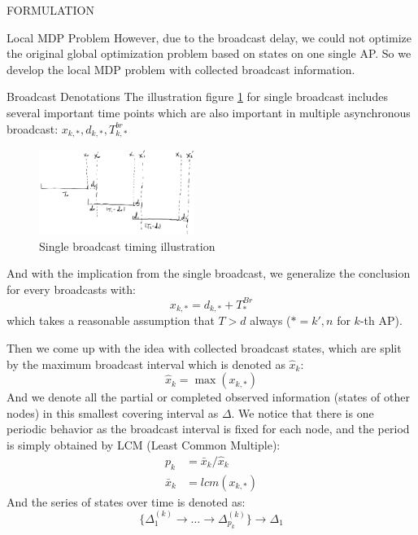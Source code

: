 \documentclass[10pt, conference, letterpaper]{IEEEtran}
\begin{document}
\begin{section}{FORMULATION}
\begin{subsection}{Local MDP Problem}
            However, due to the broadcast delay, we could not optimize the original global optimization problem based on states on one single AP. So we develop the local MDP problem with collected broadcast information.

            \begin{subsubsection}{Broadcast Denotations}
                The illustration figure \ref{fig:brd} for single broadcast includes several important time points which are also important in multiple asynchronous broadcast: $x_{k,*}, d_{k,*}, T^{br}_{k,*}$
                \begin{figure}[h]
                    \centering
                    \includegraphics[width=0.45\textwidth]{single-broadcast.png}
                    \caption{Single broadcast timing illustration}
                    \label{fig:brd}
                \end{figure}
                And with the implication from the single broadcast, we generalize the conclusion for every broadcasts with:
                $$
                x_{k,*} = d_{k,*} + T^{Br}_{*}
                $$
                which takes a reasonable assumption that $T>d$ always ($*=k',n$ for $k$-th AP).

                Then we come up with the idea with collected broadcast states, which are split by the maximum broadcast interval which is denoted as $\hat{x}_k$:
                $$
                \hat{x}_k = \max(x_{k,*})
                $$
                And we denote all the partial or completed observed information (states of other nodes) in this smallest covering interval as $\Delta$.
                We notice that there is one periodic behavior as the broadcast interval is fixed for each node, and the period is simply obtained by LCM (Least Common Multiple):
                \begin{align*}
                    p_{k} &= \bar{x}_k/\hat{x}_k
                    \\
                    \bar{x}_k &= lcm(x_{k,*})
                \end{align*}
                And the series of states over time is denoted as:
                $$
                \{ \Delta^{(k)}_1 \to \dots \to \Delta^{(k)}_{p_k} \} \to \Delta_{1}
                $$
                

\end{subsubsection}
\end{subsection}
\end{section}
\end{document}
